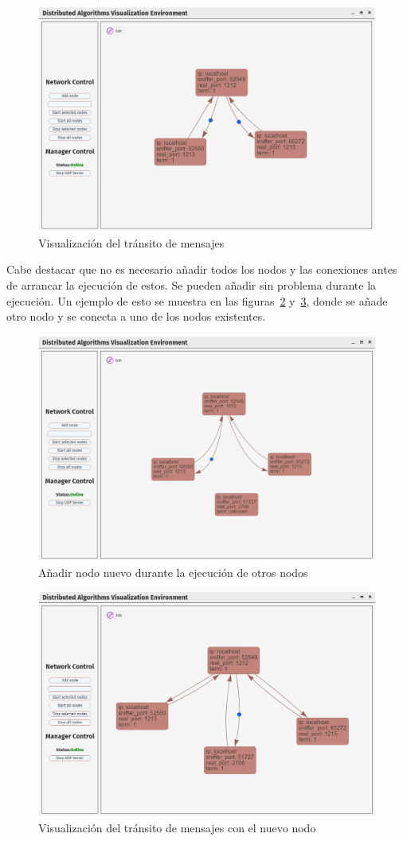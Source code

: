 \begin{figure}[!htb]
  \centering
  \includegraphics[width=0.9\linewidth]{imagenes/ui6}
  \caption{Visualización del tránsito de mensajes}
  \label{fig:ui6}
\end{figure}

Cabe destacar que no es necesario añadir todos los nodos y las conexiones antes de arrancar la ejecución de estos. Se pueden añadir sin problema durante la ejecución. Un ejemplo de esto se muestra en las figuras~\ref{fig:ui7} y~\ref{fig:ui8}, donde se añade otro nodo y se conecta a uno de los nodos existentes.

\begin{figure}[!htb]
  \centering
  \includegraphics[width=0.9\linewidth]{imagenes/ui7}
  \caption{Añadir nodo nuevo durante la ejecución de otros nodos}
  \label{fig:ui7}
\end{figure}

\begin{figure}[!htb]
  \centering
  \includegraphics[width=0.9\linewidth]{imagenes/ui8}
  \caption{Visualización del tránsito de mensajes con el nuevo nodo}
  \label{fig:ui8}
\end{figure}

\newpage